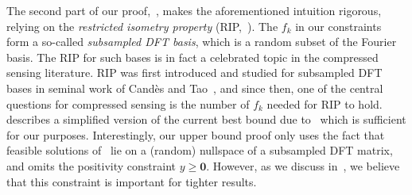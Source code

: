The second part of our proof,~, makes the aforementioned intuition rigorous, relying on the \textit{restricted isometry property} (RIP,~).
The $f_k$ in our constraints form a so-called \emph{subsampled DFT basis}, which is a random subset of the Fourier basis.
The RIP for such bases is in fact a celebrated topic in the compressed sensing literature. RIP was first introduced and studied for subsampled DFT bases in seminal work of Candès and Tao~\cite{candes2006near},
and since then, one of the central 
questions for compressed sensing is 
the number of $f_k$ needed for RIP to hold. 
 describes a simplified version of the current best bound due to~\cite{haviv2017restricted} which is sufficient for our purposes.
Interestingly, our upper bound proof only uses the fact that feasible solutions of~ lie on a (random) nullspace of a subsampled DFT matrix, and omits the positivity constraint \(y \geq \mathbf{0}\). However, as we discuss in~, we believe that this constraint is important for tighter results.
